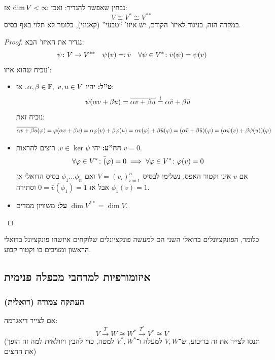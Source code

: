 \documentclass[name=רשימות אלגברה לינארית 2א]{../../../tex/classes/megasumPreamble}
\begin{document}
	נבחין שאפשר להגדיר: 
	ואכן $\dim V < \infty$ אז: 
	\[ V \cong V^* \cong V^{**} \]
	במקרה הזה, בניגוד לאיזו' הקודם, יש איזו' ``טבעי'' (קאנוני), כלומר לא תלוי באף בסיס. 
	
	\begin{proof}נגדיר את האיזו' הבא: 
		\[ \psi \colon V \to V^{**} \quad \psi(v) \eqqcolon \bar v \quad \forall \psi \in V^* \colon \bar v(\psi) = \psi(v) \]
		נוכיח שהוא איזו': 
		\begin{itemize}
			\item \textbf{ט''ל: }יהיו $\alpha, \beta \in \mathbb{F}, \ v, u \in V$. אז: 
			\[ \psi(\alpha v + \beta u) = \overline{\alpha v + \beta u} \overset{!}{=} \alpha \bar v + \beta \bar u \]
			נוכיח זאת: 
			\[ \overline{\alpha v + \beta u}(\varphi) = \varphi(\alpha v + \beta u) = \alpha \varphi(v) + \beta \varphi(u) = \alpha v(\varphi) + \beta \bar u(\varphi) = (\alpha \bar v + \beta \bar u)(\varphi) = (\alpha \psi(v) + \beta \psi(u))(\varphi) \]
			\item \textbf{חח''ע: }יהי $v \in \ker \psi$. רוצים להראות $v = 0$. 
			\[ \forall \varphi \in V^* \colon \bar (\varphi) = 0 \implies \forall \varphi \in V^* \colon \varphi(v) = 0 \]
			אם $v$ אינו וקטור האפס, נשלימו לבסיס $V = (v_i)_{i = 1}^{n}$ ואם $\phi_1 \dots \phi_n$ בסיס הדואלי אז $\phi_1(v) = 1$ אבל אז $0 = \bar v(\phi_1) = 1$ וסתירה. 
			\item \textbf{על: }משוויון ממדים $\dim V^{**} = \dim V$. 
		\end{itemize}
	\end{proof}
	כלומר, הפונקציונלים בדואלי השני הם למעשה פונקציונלים שלוקחים איזשהו פונקציונל בדואלי הראשון ומציבים בו וקטור קבוע. 
	
	\subsection{איזומורפיות למרחבי מכפלה פנימית}
	\subsubsection{העתקה צמודה (דואלית)}
	אם לצייר דיאגרמה: 
	\[ V \overset{T}{\to} W \cong W^* \overset{T^*}{\to} V^* \cong V \]
	(תנסו לצייר את זה בריבוע, ש־$V, W$ למעלה ו־$V^*, W^*$ למטה, כדי להבין ויזולאית למה זה הופך את החצים)
	
\end{document}
